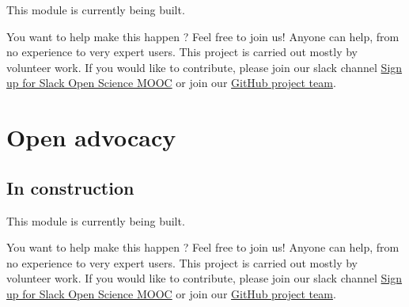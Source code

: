 \documentclass[]{book}
\begin{document}
This module is currently being built.

You want to help make this happen ? Feel free to join us! Anyone can help, from no experience to very expert users. This project is carried out mostly by volunteer work. If you would like to contribute, please join our slack channel \href{https://osmooc.herokuapp.com/}{Sign up for Slack Open Science MOOC} or join our \href{https://open-science-mooc-invite.herokuapp.com/}{GitHub project team}.

\hypertarget{module10}{%
\chapter{Open advocacy}\label{module10}}

\hypertarget{in-construction-7}{%
\section{In construction}\label{in-construction-7}}

This module is currently being built.

You want to help make this happen ? Feel free to join us! Anyone can help, from no experience to very expert users. This project is carried out mostly by volunteer work. If you would like to contribute, please join our slack channel \href{https://osmooc.herokuapp.com/}{Sign up for Slack Open Science MOOC} or join our \href{https://open-science-mooc-invite.herokuapp.com/}{GitHub project team}.


\end{document}
